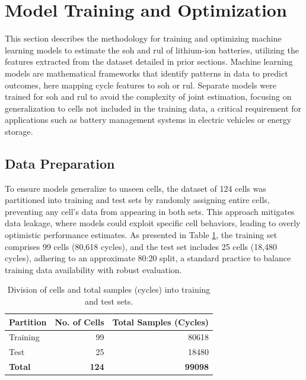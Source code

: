 \section{Model Training and Optimization}
\label{sec:optimiation}
This section describes the methodology for training and optimizing machine learning models to estimate the \acf{soh} and \acf{rul} of lithium-ion batteries, utilizing the features extracted from the dataset detailed in prior sections. Machine learning models are mathematical frameworks that identify patterns in data to predict outcomes, here mapping cycle features to \ac{soh} or \ac{rul}. Separate models were trained for \ac{soh} and \ac{rul} to avoid the complexity of joint estimation, focusing on generalization to cells not included in the training data, a critical requirement for applications such as battery management systems in electric vehicles or energy storage.

\subsection{Data Preparation}

To ensure models generalize to unseen cells, the dataset of 124 cells was partitioned into training and test sets by randomly assigning entire cells, preventing any cell’s data from appearing in both sets. This approach mitigates data leakage, where models could exploit specific cell behaviors, leading to overly optimistic performance estimates. As presented in Table \ref{tab:splits_cells_summary}, the training set comprises 99 cells (80,618 cycles), and the test set includes 25 cells (18,480 cycles), adhering to an approximate 80:20 split, a standard practice to balance training data availability with robust evaluation.

\begin{table}[h]
    \centering
    \caption{Division of cells and total samples (cycles) into training and test sets.}
    \label{tab:splits_cells_summary}
    \begin{tabular}{lrr}
        \toprule
        \textbf{Partition} & \textbf{No. of Cells} & \textbf{Total Samples (Cycles)} \\
        \midrule
        Training & 99 & 80618 \\
        Test     & 25 & 18480 \\
        \midrule
        \textbf{Total} & \textbf{124} & \textbf{99098} \\
        \bottomrule
    \end{tabular}
\end{table}

